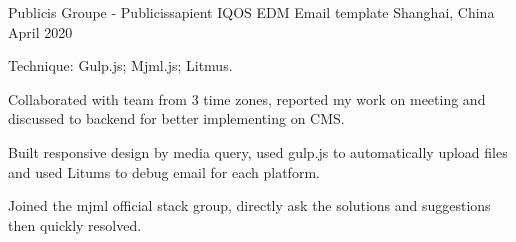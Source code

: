 \begin{cventries}
    \cventry
    {Publicis Groupe - Publicissapient} %
    {IQOS EDM Email template} %
    {Shanghai, China} %
    {April 2020} %
    {
      \begin{cvitems} %
        \item {Technique: Gulp.js; Mjml.js; Litmus.}
        \item {Collaborated with team from 3 time zones, reported my work on meeting and discussed to backend for better implementing on CMS.}
        \item {Built responsive design by media query, used gulp.js to automatically upload files and used Litums to debug email for each platform.}
        \item {Joined the mjml official stack group, directly ask the solutions and suggestions then quickly resolved.}
      \end{cvitems}
    }
    

\end{cventries}
